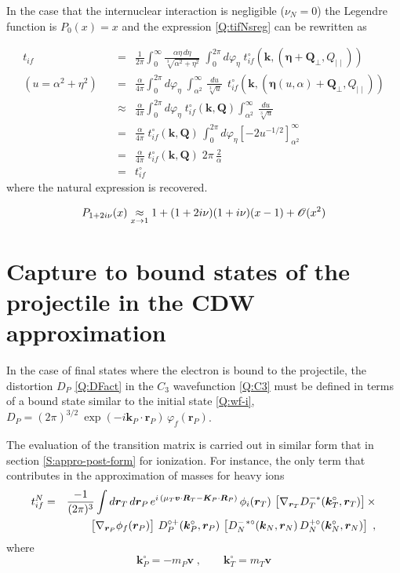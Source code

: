 In the case that the internuclear interaction is negligible
($\nu_{N}=0$) the Legendre function is $P_{0}(x)=x$ and the expression
\ref{Q:tifNsreg} can be rewritten as

\begin{eqnarray*}
t_{if} &=& \frac{1}{2 \pi} \int_{0}^{\infty} \frac{\alpha \eta \, d
\eta}{\sqrt[3]{\alpha^{2}+ \eta^{2}}}  \;\int_{0}^{2 \pi} d
\varphi_{\eta} \;
t^{\circ}_{if}(\bm{k},(\bm{\eta}+\bm{Q}_{\perp},Q_{\mid  \mid })) \\
(u = \alpha^{2}+ \eta^{2}) \quad &=&  \frac{\alpha}{4 \pi} \int_{0}^{2
\pi} d \varphi_{\eta} \; \int_{\alpha^{2}}^{\infty} \, \frac{d u
}{\sqrt[3]{u}} \;\, t^{\circ}_{if}(\bm{k},(\bm{\eta}(u,\alpha) +
\bm{Q}_{\perp},Q_{\mid  \mid }))
\\
&\approx&  \frac{\alpha}{4 \pi} \int_{0}^{2 \pi} d \varphi_{\eta} \;
t^{\circ}_{if}(\bm{k},\bm{Q}) \int_{\alpha^{2}}^{\infty} \, \frac{d u
} {\sqrt[3]{u}} \\
&=&  \frac{\alpha}{4 \pi} \; t^{\circ}_{if}(\bm{k}, \bm{Q}) \, \int_{0}^{2
\pi}
d \varphi_{\eta} \left[ - 2 u^{-1/2}\right]_{\alpha^{2}}^{\infty} \\
&=&  \frac{\alpha}{4 \pi} \; t^{\circ}_{if}(\bm{k}, \bm{Q}) \; 2 \pi \,
\frac{2}{\alpha} \\
&=& t^{\circ}_{if}
\end{eqnarray*}
%
where the natural expression is recovered.

\[
P_{1 + 2 i \nu} (x) \mathrel{\mathop{\kern0pt\approx}\limits_{x \to 1}} 1 + (1+ 2 i \nu)(1 +
i \nu) (x-1) + \mathcal{O}(x^{2})
\]

%
\section{Capture to bound states of the projectile in the CDW
approximation}

In the case of final states where the electron is bound to the
projectile, the distortion $D_{P}$ \ref{Q:DFact} in the $C_{3}$
wavefunction \ref{Q:C3} must be defined in terms of a bound state
similar to the initial state \ref{Q:wf-i}, $D_{P}=(2 \pi)^{3/2}\
\exp{\left(- i \bm{k}_{P} \cdot \bm{r}_{P} \right)} \, \varphi_{f}
(\bm{r}_{P})$.

The evaluation of the transition matrix is carried out in similar form
that in section \ref{S:appro-post-form} for ionization. For instance,
the only term that contributes in the approximation of masses for heavy
ions
\begin{eqnarray}\label{Q:tif-N-cpt}
t^{N}_{if} &=& \frac{-1}{(2 \pi)^{3}}  \int d \bm{r}_{T} \,d
\bm{r}_{P} \, e^{i \, ( \mu_{T}\bm{v} \cdot \bm{R}_{T} -
\bm{K}_{P}  \cdot \bm{R}_{P} ) }\, \phi_{i}(\bm{r}_T) \,\left[
\nabla_{\bm{r}_{T}} D^{-*}_{T}(\bm{k}^{\circ}_{T},\bm{r}_T) \right] {\times}
\\
&&  \left[ \vstretch \nabla_{\bm{r}_{P}} \phi_{f}(\bm{r}_{P}) \right]
\, D^{\circ +}_{P} (\bm{k}_{P}^{\circ},\bm{r}_{P}) \, \left[ D^{-\,\ast
\circ}_{N}(\bm{k}_{N}, \bm{r}_{N} ) \, D^{+ \circ }_{N}
(\bm{k}_{N}^{\circ},\bm{r}_{N}) \right] \; , \nonumber
\end{eqnarray}
where
\[
\bm{k}_{P}^{\circ} = - m_{P} \bm{v} \; , \qquad \bm{k}^{\circ}_{T} = m_{T} \bm{v}
\]


